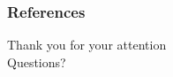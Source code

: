 \begin{frame}[allowframebreaks]
        \frametitle{References}
        
        
\end{frame}



\begin{frame}
  Thank you for your attention
  \\
  \vspace{5em}
  Questions?  
\end{frame}